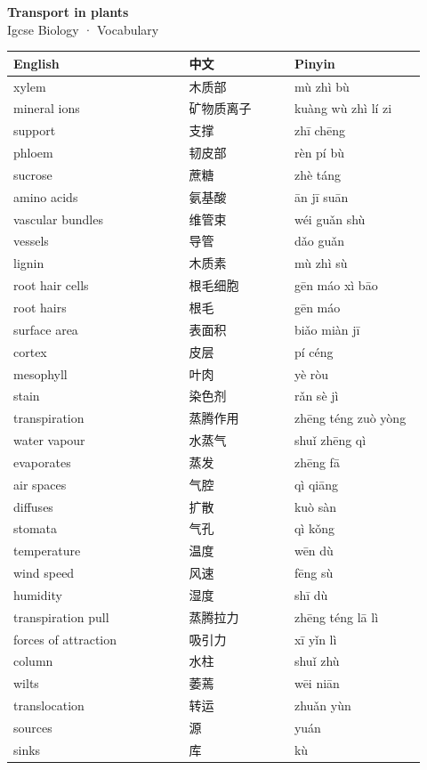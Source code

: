 \documentclass[11pt]{article}
\begin{document}
\begin{center}
  {\LARGE\bfseries Transport in plants}\\[0.35em]
  {\large Igcse Biology · Vocabulary}
\end{center}
\vspace{0.6em}

\begin{longtable}{@{}p{0.40\linewidth}p{0.24\linewidth}p{0.30\linewidth}@{}}
\toprule
\textbf{English} & \textbf{中文} & \textbf{Pinyin} \\
\midrule
\endhead
\bottomrule
\endlastfoot
xylem & 木质部 & mù zhì bù \\
mineral ions & 矿物质离子 & kuàng wù zhì lí zi \\
support & 支撑 & zhī chēng \\
phloem & 韧皮部 & rèn pí bù \\
sucrose & 蔗糖 & zhè táng \\
amino acids & 氨基酸 & ān jī suān \\
vascular bundles & 维管束 & wéi guǎn shù \\
vessels & 导管 & dǎo guǎn \\
lignin & 木质素 & mù zhì sù \\
root hair cells & 根毛细胞 & gēn máo xì bāo \\
root hairs & 根毛 & gēn máo \\
surface area & 表面积 & biǎo miàn jī \\
cortex & 皮层 & pí céng \\
mesophyll & 叶肉 & yè ròu \\
stain & 染色剂 & rǎn sè jì \\
transpiration & 蒸腾作用 & zhēng téng zuò yòng \\
water vapour & 水蒸气 & shuǐ zhēng qì \\
evaporates & 蒸发 & zhēng fā \\
air spaces & 气腔 & qì qiāng \\
diffuses & 扩散 & kuò sàn \\
stomata & 气孔 & qì kǒng \\
temperature & 温度 & wēn dù \\
wind speed & 风速 & fēng sù \\
humidity & 湿度 & shī dù \\
transpiration pull & 蒸腾拉力 & zhēng téng lā lì \\
forces of attraction & 吸引力 & xī yǐn lì \\
column & 水柱 & shuǐ zhù \\
wilts & 萎蔫 & wēi niān \\
translocation & 转运 & zhuǎn yùn \\
sources & 源 & yuán \\
sinks & 库 & kù \\
\end{longtable}
\end{document}
